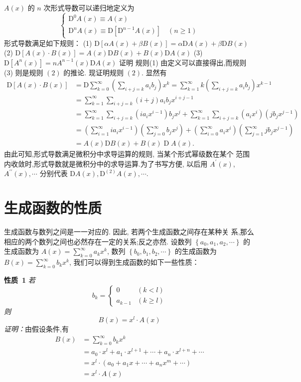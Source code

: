 \documentclass{report}
\begin{document}
$A(x)$ 的 $n$ 次形式导数可以递归地定义为
$$
\left\{\begin{array}{l}
\mathrm{D}^{0} A(x) \equiv A(x) \\
\mathrm{D}^{n} A(x) \equiv \mathrm{D}\left[\mathrm{D}^{n-1} A(x)\right] \quad(n \geqslant 1)
\end{array}\right.
$$
形式导数满足如下规则：
(1) $\mathrm{D}[\alpha A(x)+\beta B(x)]=\alpha \mathrm{D} A(x)+\beta \mathrm{D} B(x)$
(2) $\mathrm{D}[A(x) \cdot B(x)]=A(x) \mathrm{D} B(x)+B(x) \mathrm{D} A(x)$
(3) $\mathrm{D}\left[A^{n}(x)\right]=n A^{n-1}(x) \mathrm{D} A(x)$
证明 规则(1) 由定义可以直接得出,而规则 (3) 则是规则 $(2)$ 的推论. 现证明规则 $(2)$. 显然有
$$
\begin{aligned}
\mathrm{D}[A(x) \cdot B(x)] &=\mathrm{D} \sum_{k=0}^{\infty}\left(\sum_{i+j=k} a_{i} b_{j}\right) x^{k}=\sum_{k=1}^{\infty} k\left(\sum_{i+j=k} a_{i} b_{j}\right) x^{k-1} \\
&=\sum_{k=1}^{\infty} \sum_{i+j=k}(i+j) a_{i} b_{j} x^{i+j-1} \\
&=\sum_{k=1}^{\infty} \sum_{i+j=k}\left(i a_{i} x^{i-1}\right) b_{j} x^{j}+\sum_{k=1}^{\infty} \sum_{i+j=k}\left(a_{i} x^{i}\right)\left(j b_{j} x^{j-1}\right) \\
&=\left(\sum_{i=1}^{\infty} i a_{i} x^{i-1}\right)\left(\sum_{j=0}^{\infty} b_{j} x^{j}\right)+\left(\sum_{i=0}^{\infty} a_{i} x^{i}\right)\left(\sum_{j=1}^{\infty} j b_{j} x^{j-1}\right) \\
&=A(x) \mathrm{D} B(x)+B(x) \operatorname{D} A(x) .
\end{aligned}
$$
由此可知,形式导数满足微积分中求导运算的规则, 当某个形式幂级数在某个 范围内收敛时,形式导数就是微积分中的求导运算.为了书写方便, 以后用 $A^{\prime}(x)$, $A^{\prime \prime}(x), \cdots$ 分别代表 $\mathrm{D} A(x), \mathrm{D}^{(2)} A(x), \cdots .$

\section{生成函数的性质}
生成函数与数列之间是一一对应的. 因此, 若两个生成函数之间存在某种关 系,那么相应的两个数列之间也必然存在一定的关系;反之亦然.
设数列 $\left\{a_{0}, a_{1}, a_{2}, \cdots\right\}$ 的生成函数为 $A(x)=\sum_{k=0}^{\infty} a_{k} x^{k}$, 数列 $\left\{b_{0}, b_{1}, b_{2}, \cdots\right\}$
的生成函数为 $B(x)=\sum_{k=0}^{\infty} b_{k} x^{k}$, 我们可以得到生成函数的如下一些性质：

\noindent
\textbf{性质\ 1} \textsl{若
$$
b_{k}=\left\{\begin{array}{ll}
0 & (k<l) \\ a_{k-1} & (k \geqslant l)
\end{array}\right.
$$
则
$$
B(x)=x^{l} \cdot A(x)
$$
证明：}由假设条件,有
$$
\begin{aligned}
B(x) &=\sum_{k=0}^{\infty} b_{k} x^{k} \\
&=a_{0} \cdot x^{l}+a_{1} \cdot x^{l+1}+\cdots+a_{n} \cdot x^{l+n}+\cdots \\
&=x^{l} \cdot\left(a_{0}+a_{1} x+\cdots+a_{n} x^{m}+\cdots\right) \\
&=x^{l} \cdot A(x)
\end{aligned}
$$
\end{document}
